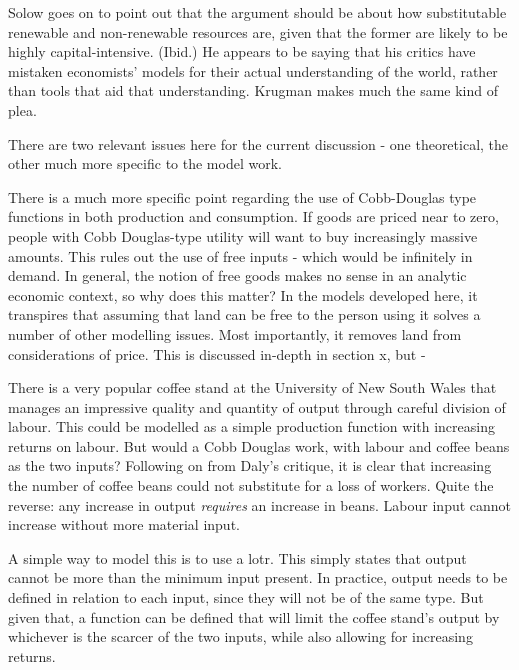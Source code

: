 Solow goes on to point out that the argument should be about how substitutable renewable and non-renewable resources are, given that the former are likely to be highly capital-intensive. (Ibid.) He appears to be saying that his critics have mistaken economists' models for their actual understanding of the world, rather than tools that aid that understanding. Krugman makes much the same kind of plea.  

There are two relevant issues here for the current discussion - one theoretical, the other much more specific to the model work. 

There is a much more specific point regarding the use of Cobb-Douglas type functions in both production and consumption. If goods are priced near to zero, people with Cobb Douglas-type utility will want to buy increasingly massive amounts. This rules out the use of free inputs - which would be infinitely in demand. In general, the notion of free goods makes no sense in an analytic economic context, so why does this matter? In the models developed here, it transpires that assuming that land can be free to the person using it solves a number of other modelling issues. Most importantly, it removes land from considerations of price. This is discussed in-depth in section x, but -

There is a very popular coffee stand at the University of New South Wales that manages an impressive quality and quantity of output through careful division of labour. This could be modelled as a simple production function with increasing returns on labour. But would a Cobb Douglas work, with labour and coffee beans as the two inputs? Following on from Daly's critique, it is clear that increasing the number of coffee beans could not substitute for a loss of workers. Quite the reverse: any increase in output \emph{requires} an increase in beans. Labour input cannot increase without more material input.

A simple way to model this is to use a \gls{lotr}. This simply states that output cannot be more than the minimum input present. In practice, output needs to be defined in relation to each input, since they will not be of the same type. But given that, a function can be defined that will limit the coffee stand's output by whichever is the scarcer of the two inputs, while also allowing for increasing returns.


